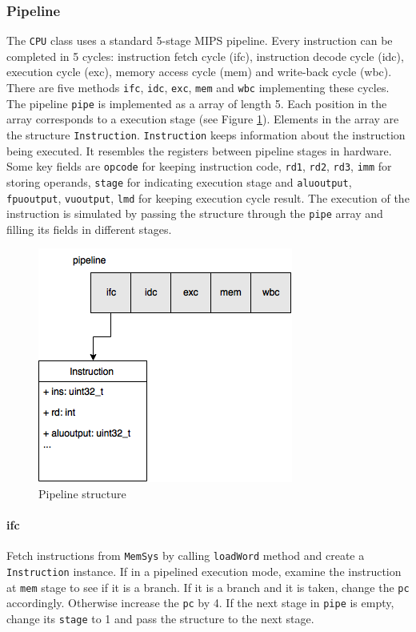 \documentclass{sig-alternate}
\begin{document}
\subsubsection{Pipeline}
The \texttt{CPU} class uses a standard 5-stage MIPS pipeline. Every instruction can be completed in 5 cycles: instruction fetch cycle (ifc), instruction decode cycle (idc), execution cycle (exc), memory access cycle (mem) and write-back cycle (wbc). There are five methods \texttt{ifc}, \texttt{idc}, \texttt{exc}, \texttt{mem} and \texttt{wbc} implementing these cycles. The pipeline \texttt{pipe} is implemented as a array of length 5. Each position in the array corresponds to a execution stage (see Figure \ref{fig:pip}). Elements in the array are the structure \texttt{Instruction}. \texttt{Instruction} keeps information about the instruction being executed. It resembles the registers between pipeline stages in hardware. Some key fields are \texttt{opcode} for keeping instruction code, \texttt{rd1}, \texttt{rd2}, \texttt{rd3}, \texttt{imm} for storing operands, \texttt{stage} for indicating execution stage and \texttt{aluoutput}, \texttt{fpuoutput}, \texttt{vuoutput}, \texttt{lmd} for keeping execution cycle result. The execution of the instruction is simulated by passing the structure through the \texttt{pipe} array and filling its fields in different stages. 

\begin{figure}
\centering
\includegraphics[width = 0.8\linewidth,keepaspectratio]{pipeline}
\caption{Pipeline structure}
\label{fig:pip}
\end{figure}

\paragraph{ifc}
Fetch instructions from \texttt{MemSys} by calling \texttt{loadWord} method and create a \texttt{Instruction} instance. If in a pipelined execution mode, examine the instruction at \texttt{mem} stage to see if it is a branch. If it is a branch and it is taken, change the \texttt{pc} accordingly. Otherwise increase the \texttt{pc} by 4. If the next stage in \texttt{pipe} is empty, change its \texttt{stage} to 1 and pass the structure to the next stage.  
\end{document}
